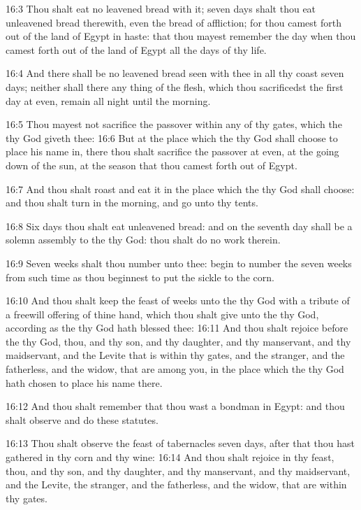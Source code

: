 16:3 Thou shalt eat no leavened bread with it; seven days shalt thou eat unleavened bread therewith, even the bread of affliction; for thou camest forth out of the land of Egypt in haste: that thou mayest remember the day when thou camest forth out of the land of Egypt all the days of thy life.

16:4 And there shall be no leavened bread seen with thee in all thy coast seven days; neither shall there any thing of the flesh, which thou sacrificedst the first day at even, remain all night until the morning.

16:5 Thou mayest not sacrifice the passover within any of thy gates, which the \LORD thy God giveth thee: 16:6 But at the place which the \LORD thy God shall choose to place his name in, there thou shalt sacrifice the passover at even, at the going down of the sun, at the season that thou camest forth out of Egypt.

16:7 And thou shalt roast and eat it in the place which the \LORD thy God shall choose: and thou shalt turn in the morning, and go unto thy tents.

16:8 Six days thou shalt eat unleavened bread: and on the seventh day shall be a solemn assembly to the \LORD thy God: thou shalt do no work therein.

16:9 Seven weeks shalt thou number unto thee: begin to number the seven weeks from such time as thou beginnest to put the sickle to the corn.

16:10 And thou shalt keep the feast of weeks unto the \LORD thy God with a tribute of a freewill offering of thine hand, which thou shalt give unto the \LORD thy God, according as the \LORD thy God hath blessed thee: 16:11 And thou shalt rejoice before the \LORD thy God, thou, and thy son, and thy daughter, and thy manservant, and thy maidservant, and the Levite that is within thy gates, and the stranger, and the fatherless, and the widow, that are among you, in the place which the \LORD thy God hath chosen to place his name there.

16:12 And thou shalt remember that thou wast a bondman in Egypt: and thou shalt observe and do these statutes.

16:13 Thou shalt observe the feast of tabernacles seven days, after that thou hast gathered in thy corn and thy wine: 16:14 And thou shalt rejoice in thy feast, thou, and thy son, and thy daughter, and thy manservant, and thy maidservant, and the Levite, the stranger, and the fatherless, and the widow, that are within thy gates.

